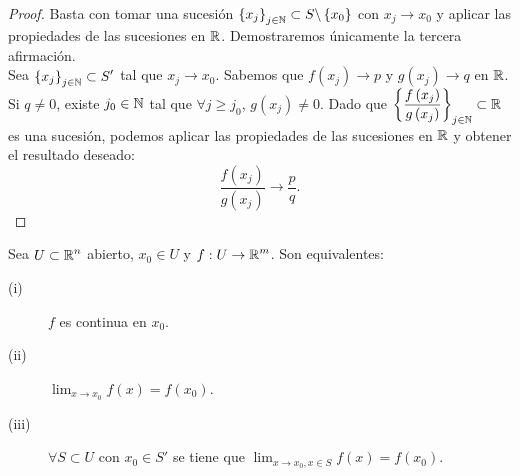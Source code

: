 \begin{proof}
	Basta con tomar una sucesión $\displaystyle \left\{ x_{j}\right\} _{j \in \mathbb{N}} \subset S \backslash \left\{ x_{0}\right\} $ con $\displaystyle x_{j} \to x_{0} $ y aplicar las propiedades de las sucesiones en $\displaystyle \mathbb{R} $. Demostraremos únicamente la tercera afirmación. \\
 Sea $\displaystyle \left\{ x_{j}\right\} _{j\in \mathbb{N}}\subset S' $ tal que $\displaystyle x_{j} \to x_{0} $. Sabemos que $\displaystyle f\left(x_{j}\right) \to p $ y $\displaystyle g\left(x_{j}\right) \to q $ en $\displaystyle \mathbb{R} $. Si $\displaystyle q \neq 0 $, existe $\displaystyle j_{0} \in \mathbb{N} $ tal que $\displaystyle \forall j \geq j_{0} $, $\displaystyle g\left(x_{j}\right) \neq 0 $. 
 Dado que $\displaystyle \left\{ \frac{f\left(x_{j}\right)}{g\left(x_{j}\right)}\right\} _{j \in \mathbb{N}} \subset \mathbb{R} $ es una sucesión, podemos aplicar las propiedades de las sucesiones en $\displaystyle \mathbb{R} $ y obtener el resultado deseado: 
 \[ \frac{f\left(x_{j}\right)}{g\left(x_{j}\right)} \to \frac{p}{q} .\]
\end{proof}
\begin{prop}
Sea $\displaystyle U \subset \mathbb{R}^{n} $ abierto, $\displaystyle x_{0} \in U $ y $\displaystyle f : U \to \mathbb{R}^{m} $. Son equivalentes:
\begin{description}
\item[(i)] $\displaystyle f $ es continua en $\displaystyle x_{0} $.
\item[(ii)] $\displaystyle \lim_{x \to x_{0}}f\left(x\right) = f\left(x_{0}\right) $.
\item[(iii)] $\displaystyle \forall S \subset U $ con $\displaystyle x_{0} \in S' $ se tiene que $\displaystyle \lim_{x \to x_{0}, x \in S}f\left(x\right) = f\left(x_{0}\right) $.
\end{description}
\end{prop}
